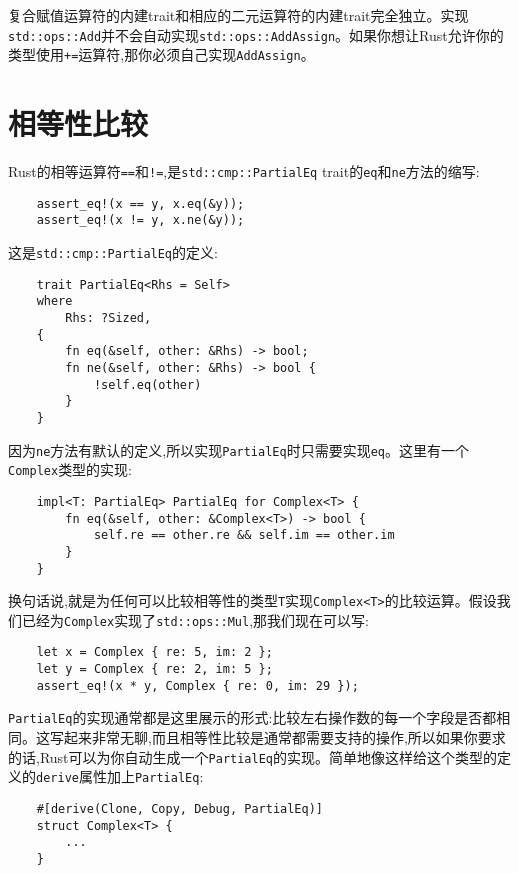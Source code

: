 复合赋值运算符的内建trait和相应的二元运算符的内建trait完全独立。实现\texttt{std::ops::Add}并不会自动实现\texttt{std::ops::AddAssign}。如果你想让Rust允许你的类型使用\texttt{+=}运算符,那你必须自己实现\texttt{AddAssign}。

\section{相等性比较}\label{equal}

Rust的相等运算符\texttt{==}和\texttt{!=},是\texttt{std::cmp::PartialEq} trait的\texttt{eq}和\texttt{ne}方法的缩写:
\begin{verbatim}
    assert_eq!(x == y, x.eq(&y));
    assert_eq!(x != y, x.ne(&y));
\end{verbatim}

这是\texttt{std::cmp::PartialEq}的定义:
\begin{verbatim}
    trait PartialEq<Rhs = Self>
    where
        Rhs: ?Sized,
    {
        fn eq(&self, other: &Rhs) -> bool;
        fn ne(&self, other: &Rhs) -> bool {
            !self.eq(other)
        }
    }
\end{verbatim}

因为\texttt{ne}方法有默认的定义,所以实现\texttt{PartialEq}时只需要实现\texttt{eq}。这里有一个\texttt{Complex}类型的实现:
\begin{verbatim}
    impl<T: PartialEq> PartialEq for Complex<T> {
        fn eq(&self, other: &Complex<T>) -> bool {
            self.re == other.re && self.im == other.im
        }
    }
\end{verbatim}

换句话说,就是为任何可以比较相等性的类型\texttt{T}实现\texttt{Complex<T>}的比较运算。假设我们已经为\texttt{Complex}实现了\texttt{std::ops::Mul},那我们现在可以写:
\begin{verbatim}
    let x = Complex { re: 5, im: 2 };
    let y = Complex { re: 2, im: 5 };
    assert_eq!(x * y, Complex { re: 0, im: 29 });
\end{verbatim}

\texttt{PartialEq}的实现通常都是这里展示的形式:比较左右操作数的每一个字段是否都相同。这写起来非常无聊,而且相等性比较是通常都需要支持的操作,所以如果你要求的话,Rust可以为你自动生成一个\texttt{PartialEq}的实现。简单地像这样给这个类型的定义的\texttt{derive}属性加上\texttt{PartialEq}:
\begin{verbatim}
    #[derive(Clone, Copy, Debug, PartialEq)]
    struct Complex<T> {
        ...
    }
\end{verbatim}

